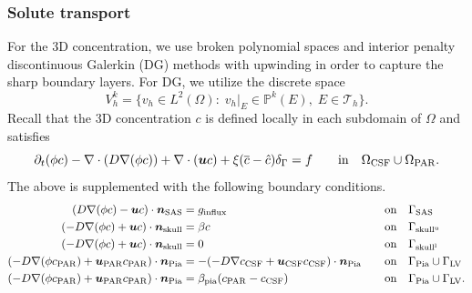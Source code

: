 \documentclass[fleqn,10pt]{wlscirep}
\newcommand{\mar}[1]{\textcolor{violet}{#1}}
\newcommand{\pia}{\Gamma_{\rm{Pia}}}
\newcommand{\spinal}{\Gamma_{\rm SAS}}
\begin{document}
\subsubsection{Solute transport} For the 3D concentration, we use broken polynomial spaces and interior penalty discontinuous Galerkin (DG) methods with upwinding in order to capture the sharp boundary layers.  For DG, we utilize the discrete space 
\begin{equation}
V_h^k = \{v_h \in L^2(\Omega): \;  v_h \vert_E \in \mathbb{P}^k(E), \; E \in \mathcal{T}_h\}.
\end{equation}
Recall that the 3D concentration $c$ is defined locally in each subdomain of $\Omega$ and satisfies
\begin{equation}
     \partial_t (\phi c) - \nabla \cdot (D \nabla (\phi c) ) + \nabla \cdot (\bm u c ) + \xi (\overline{c} - \hat c ) \delta_\Gamma = f \quad \quad \mathrm{in} \quad \Omega_{\rm CSF} \cup \Omega_{\rm{PAR}}.  \label{eq:3d_pde}
\end{equation}
The above is supplemented with the following boundary conditions. 
\begin{alignat}{2}
(D \nabla (\phi c) - \bm u c ) \cdot \bm{n}_{\rm SAS} &= g_{\mathrm{influx}} &&  \quad  \mathrm{on} \quad \spinal  \\ 
(-D \nabla (\phi c) + \bm u c ) \cdot \bm{n}_{\rm skull} & =   \beta c  &&  \quad  \mathrm{on} \quad \Gamma_{\rm skull^{u}}  \\ 
(-D \nabla (\phi c) + \bm u c ) \cdot \bm{n}_{\rm skull} & =   0  &&  \quad  \mathrm{on} \quad \Gamma_{\rm skull^{l}}  \\ 
(-D \nabla (\phi c_{\rm{PAR}}) + \bm u_{\rm{PAR}} c_{\rm{PAR} }) \cdot \bm{n}_{\rm{Pia}} &= - (-D \nabla  c_{\rm{CSF}} + \bm u_{\rm CSF} c_{\rm CSF} ) \cdot \bm{n}_{\rm{Pia}} &&  \quad  \mathrm{on} \quad \pia \cup \Gamma_{\mathrm{LV}}  \\ 
(-D \nabla (\phi c_{\rm{PAR}}) + \bm u_{\rm{PAR}} c_{\rm{PAR} }) \cdot \bm{n}_{\rm{Pia}} & = \beta_{\rm{pia}} (c_{\rm PAR} - c_{\mathrm{CSF}}) &&  \quad  \mathrm{on} \quad \pia \cup \Gamma_{\mathrm{LV}}   .  
\end{alignat} 

\end{document}
